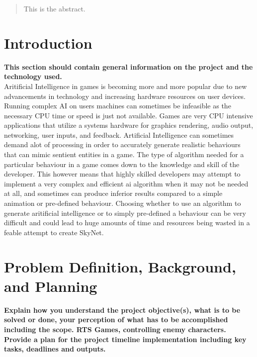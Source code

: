 \documentclass[12pt,a4paper,titlepage]{article}
\begin{document}


\begin{abstract}
This is the abstract.
\end{abstract}

\tableofcontents

\newpage

\listoftables

\newpage

\listoffigures

\newpage

\section{Introduction}
\textbf{This section should contain general information on the project and the technology used.}\\

Aritificial Intelligence in games is becoming more and more popular due to new advancements in technology and increasing hardware resources on user devices. Running complex AI on users machines can sometimes be infeasible as the necessary CPU time or speed is just not available. Games are very CPU intensive applications that utilize a systems hardware for graphics rendering, audio output, networking, user inputs, and feedback. Artificial Intelligence can sometimes demand alot of processing in order to accurately generate realistic behaviours that can mimic sentient entities in a game. The type of algorithm needed for a particular behaviour in a game comes down to the knowledge and skill of the developer. This however means that highly skilled developers may attempt to implement a very complex and efficient ai algorithm when it may not be needed at all, and sometimes can produce inferior results compared to a simple animation or pre-defined behaviour. Choosing whether to use an algorithm to generate aritificial intelligence or to simply pre-defined a behaviour can be very difficult and could lead to huge amounts of time and resources being wasted in a feable attempt to create SkyNet\cite{skynet}.  

\section{Problem Definition, Background, and Planning}

\textbf{Explain how you understand the project objective(s), what is to be solved or done, your perception of what has to be accomplished including the scope. RTS Games, controlling enemy characters. Provide a plan for the project timeline implementation including key tasks, deadlines and outputs.}\\
\end{document}

